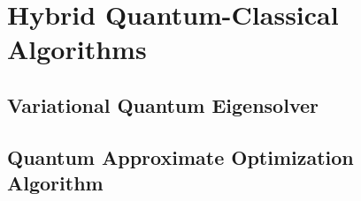 \chapter[Hybrid Quantum-Classical Algorithms]{Hybrid Quantum-Classical\\Algorithms} \label{chap:hybrid-quantum-classical-algorithms}

\section{Variational Quantum Eigensolver}

\section{Quantum Approximate Optimization Algorithm}